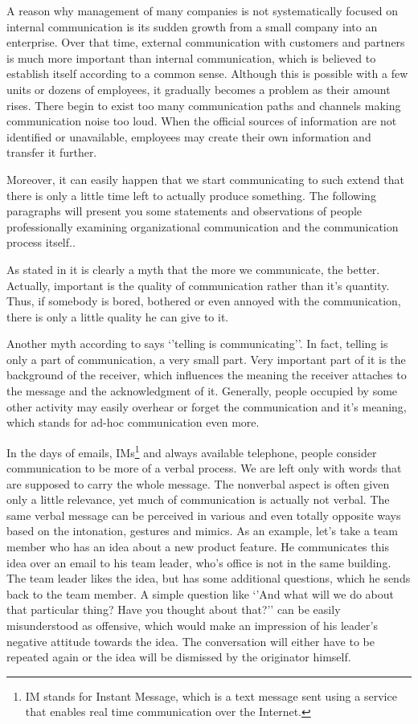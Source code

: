 \documentclass[11pt,singleside]{myfithesis2}
\begin{document}
A reason why management of many companies is not systematically focused on internal communication is its sudden growth from a small company into an enterprise. Over that time, external communication with customers and partners is much more important than internal communication, which is believed to establish itself according to a common sense. Although this is possible with a few units or dozens of employees, it gradually becomes a problem as their amount rises. There begin to exist too many communication paths and channels making communication noise too loud. When the official sources of information are not identified or unavailable, employees may create their own information and transfer it further.

Moreover, it can easily happen that we start communicating to such extend that there is only a little time left to actually produce something. The following paragraphs will present you some statements and observations of people professionally examining organizational communication and the communication process itself..

As stated in \cite{orgCommForSurvival} it is clearly a myth that the more we communicate, the better. Actually, important is the quality of communication rather than it's quantity. Thus, if somebody is bored, bothered or even annoyed with the communication, there is only a little quality he can give to it.

Another myth according to \cite{orgCommForSurvival} says `'telling is communicating''. In fact, telling is only a part of communication, a very small part. Very important part of it is the background of the receiver, which influences the meaning the receiver attaches to the message and the acknowledgment of it. Generally, people occupied by some other activity may easily overhear or forget the communication and it's meaning, which stands for ad-hoc communication even more.

In the days of emails, IMs\footnote{IM stands for Instant Message, which is a text message sent using a service that enables real time communication over the Internet.} and always available telephone, people consider communication to be more of a verbal process. We are left only with words that are supposed to carry the whole message. The nonverbal aspect is often given only a little relevance, yet much of communication is actually not verbal. The same verbal message can be perceived in various and even totally opposite ways based on the intonation, gestures and mimics. As an example, let's take a team member who has an idea about a new product feature. He communicates this idea over an email to his team leader, who's office is not in the same building. The team leader likes the idea, but has some additional questions, which he sends back to the team member. A simple question like `'And what will we do about that particular thing? Have you thought about that?'' can be easily misunderstood as offensive, which would make an impression of his leader's negative attitude towards the idea. The conversation will either have to be repeated again or the idea will be dismissed by the originator himself.
\end{document}
